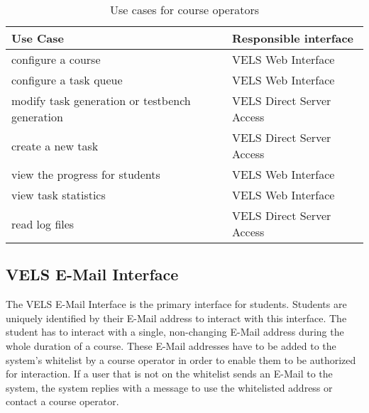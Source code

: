\begin{table}[h]
\centering
\begin{tabular}{||l | l||}
    \hline
    Use Case & Responsible interface \\ [0.5ex]
    \hline\hline
    configure a course & VELS Web Interface
    \\
    \hline
    configure a task queue & VELS Web Interface
    \\
    \hline
    modify task generation or testbench generation & VELS Direct Server Access
    \\
    \hline
    create a new task & VELS Direct Server Access
    \\
    \hline
    view the progress for students & VELS Web Interface
    \\
    \hline
    view task statistics & VELS Web Interface
    \\
    \hline
    read log files & VELS Direct Server Access
    \\
    \hline
\end{tabular}
\caption{Use cases for course operators}
\label{tab:useoperator}
\end{table}

\newpage

\subsection{VELS E-Mail Interface}\label{emailinterface}
The VELS E-Mail Interface is the primary interface for students. Students are uniquely
identified by their E-Mail address to interact with this interface. The student has to
interact with a single, non-changing E-Mail address during the whole duration of a course.
These E-Mail addresses have to be added to the system's whitelist by a course operator
in order to enable them to be authorized for interaction. If a user that is not on the
whitelist sends an E-Mail to the system, the system replies with a message to use the
whitelisted address or contact a course operator.

